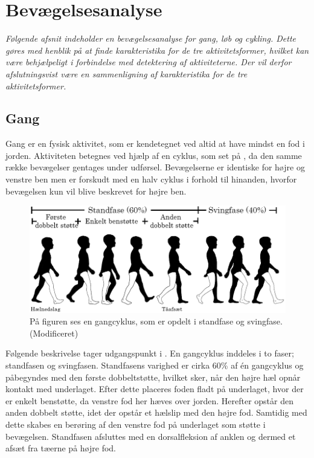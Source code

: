 \section{Bevægelsesanalyse} \label{bevaegelse}
\textit{Følgende afsnit indeholder en bevægelsesanalyse for gang, løb og cykling. Dette gøres med henblik på at finde karakteristika for de tre aktivitetsformer, hvilket kan være behjælpeligt i forbindelse med detektering af aktiviteterne. Der vil derfor afslutningsvist være en sammenligning af karakteristika for de tre aktivitetsformer.}

\subsection{Gang}
Gang er en fysisk aktivitet, som er kendetegnet ved altid at have mindst en fod i jorden. Aktiviteten betegnes ved hjælp af en cyklus, som set på , da den samme række bevægelser gentages under udførsel. Bevægelserne er identiske for højre og venstre ben men er forskudt med en halv cyklus i forhold til hinanden, hvorfor bevægelsen kun vil blive beskrevet for højre ben. \citep{VaughanDavisOConnor1992,Whittle1990} 
\begin{figure}[H]
	\centering
	\includegraphics[scale=0.7]{figures/bProblemloesning/gang_cyklus.png}
	\caption{På figuren ses en gangcyklus, som er opdelt i standfase og svingfase. \citep{VaughanDavisOConnor1992} (Modificeret)}
	\label{fig:gang_cyklus}
\end{figure}
Følgende beskrivelse tager udgangspunkt i . En gangcyklus inddeles i to faser; standfasen og svingfasen. Standfasens varighed er cirka 60\% af én gangcyklus og påbegyndes med den første dobbeltstøtte, hvilket sker, når den højre hæl opnår kontakt med underlaget. Efter dette placeres foden fladt på underlaget, hvor der er enkelt benstøtte, da venstre fod her hæves over jorden. Herefter opstår den anden dobbelt støtte, idet der opstår et hælslip med den højre fod. Samtidig med dette skabes en berøring af den venstre fod på underlaget som støtte i bevægelsen. Standfasen afsluttes med en dorsalfleksion af anklen og dermed et afsæt fra tæerne på højre fod. \citep{VaughanDavisOConnor1992,Whittle1990}  \newline 
